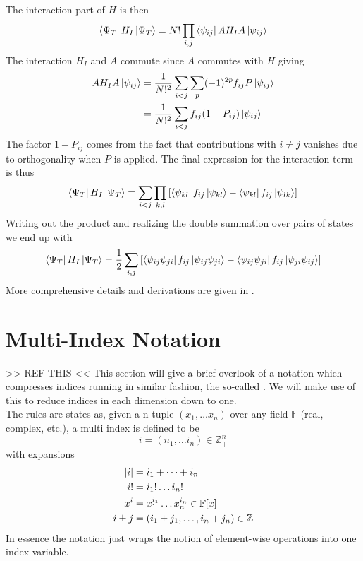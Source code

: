         The interaction part of $H$ is then
            \begin{equation}
                \bra{\Psi_T}H_I\ket{\Psi_T} = N!\prod_{i,j}\bra{\psi_{ij}}AH_IA\ket{\psi_{ij}}
            \end{equation}
        The interaction $H_I$ and $A$ commute since $A$ commutes with $H$
        giving
            \begin{align}
                AH_IA\ket{\psi_{ij}} &= \frac{1}{N!^2}\sum_{i<j}\sum_{p}
                (-1)^{2p}f_{ij} P\ket{\psi_{ij}} \\
                &= \frac{1}{N!^2}\sum_{i<j}f_{ij}(1-P_{ij})\ket{\psi_{ij}}
            \end{align}
        The factor $1-P_{ij}$ comes from the fact that contributions with
        $i\neq j$ vanishes due to orthogonality when $P$ is applied. The final
        expression for the interaction term is thus
            \begin{equation}
                \bra{\Psi_T}H_I\ket{\Psi_T} =
                \sum_{i<j}\prod_{k,l}\left[\bra{\psi_{kl}}f_{ij}\ket{\psi_{kl}} -
                \bra{\psi_{kl}}f_{ij}\ket{\psi_{lk}}\right]
            \end{equation}
        Writing out the product and realizing the double summation over pairs
        of states we end up with
            \begin{equation}
                \bra{\Psi_T}H_I\ket{\Psi_T} = \frac{1}{2}
                \sum_{i,j}\left[\bra{\psi_{ij}\psi_{ji}}f_{ij}\ket{\psi_{ij}\psi_{ji}} -
                \bra{\psi_{ij}\psi_{ji}}f_{ij}\ket{\psi_{ji}\psi_{ij}}\right]
            \end{equation}
        More comprehensive details and derivations are given in
        \cite{compphysThijssen,basicMB}.

\section{Multi-Index Notation\label{sec:multiIndexNotation}}
    >> REF THIS <<
    This section will give a brief overlook of a notation which compresses
    indices running in similar fashion, the so-called . We will make use of this to reduce indices in each dimension
    down to one. \\
    The rules are states as, given a n-tuple $(x_1,\dots x_n)$ over any field
    $\mathbb{F}$ (real, complex, etc.), a multi index is defined to be 
        \begin{equation}
            i=(n_1,\dots i_n)\in \mathbb{Z}^n_+
        \end{equation}
    with expansions
        \begin{equation}
            \begin{aligned}
                \abs{i} &= i_1 + \dots + i_n \\
                i! &= i_1! \dots i_n! \\
                x^i &= x^{i_1}_1 \dots x^{i_n}_n \in \mathbb{F}[x] \\
                i \pm j &= (i_1 \pm j_1,\dots, i_n+j_n) \in \mathbb{Z}
            \end{aligned}
        \end{equation}
    In essence the notation just wraps the notion of element-wise operations
    into one index variable.
